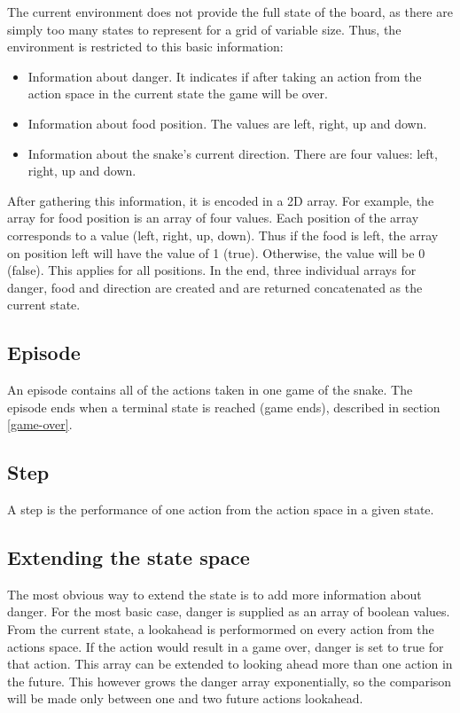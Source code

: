 \documentclass[lettersize,journal]{IEEEtran}
\begin{document}
The current environment does not provide the full state of the board,
as there are simply too many states to represent for a grid
of variable size. Thus, the environment is restricted to
this basic information:
\begin{itemize}
    \item Information about danger. It indicates if after taking an action from the action space in the current state
        the game will be over. %
    \item Information about food position. The values are left, right, up and down.
    \item Information about the snake's current direction. There are four values: left, right, up and down.
\end{itemize}

After gathering this information, it is encoded in a 2D array. For example, the array for food position
is an array of four values. Each position of the array corresponds to a value (left, right, up, down).
Thus if the food is left, the array on position left will have the value of 1 (true). Otherwise, the
value will be 0 (false). This applies for all positions. In the end, three individual arrays for danger,
food and direction are created and are returned concatenated as the current state.


\subsection{Episode}
An episode contains all of the actions taken in one game
of the snake. The episode ends when a terminal state is
reached (game ends), described in section \ref{game-over}.

\subsection{Step}
A step is the performance of one action from the action space in a given state.



\subsection{Extending the state space}
The most obvious way to extend the state is to add more
information about danger. For the most basic case, danger
is supplied as an array of boolean values. From the current
state, a lookahead is performormed on every action from
the actions space. If the action would result in a game
over, danger is set to true for that action. This
array can be extended to looking ahead more than one action
in the future. This however grows the danger array
exponentially, so the comparison will be made only between
one and two future actions lookahead.
\end{document}
